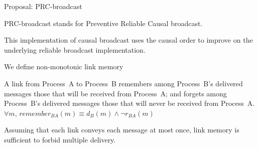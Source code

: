 \documentclass[10pt, xcolor={usenames, dvipsnames}]{beamer}
\begin{document}
\begin{frame}{Proposal: PRC-broadcast}

  PRC-broadcast stands for Preventive Reliable Causal broadcast.
  
  \vspace{1em}
  
  This implementation of causal broadcast uses the causal order to improve on
  the underlying reliable broadcast implementation.


\end{frame}


\begin{frame}{We define non-monotonic link memory}

  \begin{definition}
    A link from Process~A to Process~B remembers among Process~B's delivered
    messages those that will be received from Process~A; and forgets among
    Process~B's delivered messages those that will never be received from
    Process~A.\\
    $\forall m,\, remember_{BA}(m) \equiv d_B(m) \wedge \neg r_{BA}(m)$
  \end{definition}

  \vspace{2em}

  \begin{theorem}
    Assuming that each link conveys each message at most once, link memory is
    sufficient to forbid multiple delivery.
  \end{theorem}

\end{frame}
\end{document}
